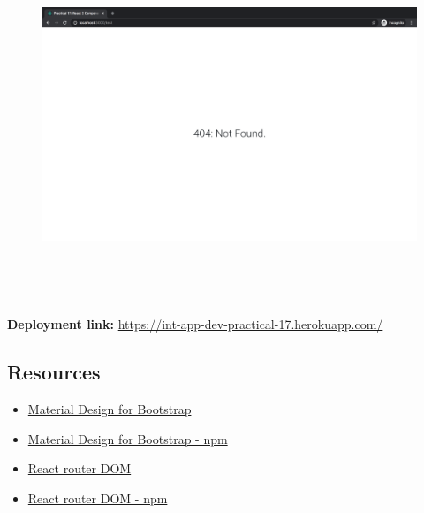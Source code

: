 \documentclass{article}
\begin{document}
\begin{figure}[H]
  \includegraphics[width=175mm, height=105mm]{./img/17-expected-form-3.png}
\end{figure}

\textbf{Deployment link:} \href{https://int-app-dev-practical-17.herokuapp.com/}{https://int-app-dev-practical-17.herokuapp.com/} 

\subsection*{Resources} 
\begin{itemize}
  \item \href{https://mdbootstrap.com/}{Material Design for Bootstrap}
  \item \href{https://www.npmjs.com/package/mdbreact/}{Material Design for Bootstrap - npm}
  \item \href{https://reactrouter.com/web/guides/quick-start/}{React router DOM}
  \item \href{https://www.npmjs.com/package/react-router-dom/}{React router DOM - npm}
\end{itemize}
 
\end{document}
